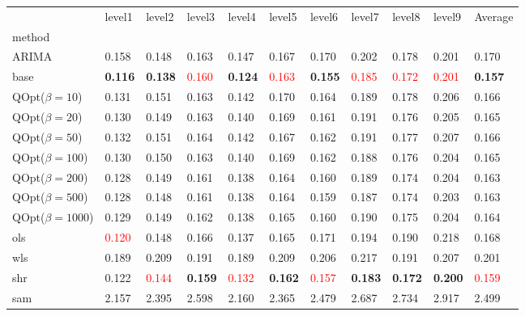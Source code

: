 \begin{tabular}{lllllllllll}
\toprule
 & level1 & level2 & level3 & level4 & level5 & level6 & level7 & level8 & level9 & Average \\
method &  &  &  &  &  &  &  &  &  &  \\
\midrule
ARIMA & 0.158 & 0.148 & 0.163 & 0.147 & 0.167 & 0.170 & 0.202 & 0.178 & 0.201 & 0.170 \\
base & \textbf{0.116} & \textbf{0.138} & \textcolor{red}{0.160} & \textbf{0.124} & \textcolor{red}{0.163} & \textbf{0.155} & \textcolor{red}{0.185} & \textcolor{red}{0.172} & \textcolor{red}{0.201} & \textbf{0.157} \\
\midrule
QOpt($\beta=10$) & 0.131 & 0.151 & 0.163 & 0.142 & 0.170 & 0.164 & 0.189 & 0.178 & 0.206 & 0.166 \\
QOpt($\beta=20$) & 0.130 & 0.149 & 0.163 & 0.140 & 0.169 & 0.161 & 0.191 & 0.176 & 0.205 & 0.165 \\
QOpt($\beta=50$) & 0.132 & 0.151 & 0.164 & 0.142 & 0.167 & 0.162 & 0.191 & 0.177 & 0.207 & 0.166 \\
QOpt($\beta=100$) & 0.130 & 0.150 & 0.163 & 0.140 & 0.169 & 0.162 & 0.188 & 0.176 & 0.204 & 0.165 \\
QOpt($\beta=200$) & 0.128 & 0.149 & 0.161 & 0.138 & 0.164 & 0.160 & 0.189 & 0.174 & 0.204 & 0.163 \\
QOpt($\beta=500$) & 0.128 & 0.148 & 0.161 & 0.138 & 0.164 & 0.159 & 0.187 & 0.174 & 0.203 & 0.163 \\
QOpt($\beta=1000$) & 0.129 & 0.149 & 0.162 & 0.138 & 0.165 & 0.160 & 0.190 & 0.175 & 0.204 & 0.164 \\
\midrule
ols & \textcolor{red}{0.120} & 0.148 & 0.166 & 0.137 & 0.165 & 0.171 & 0.194 & 0.190 & 0.218 & 0.168 \\
wls & 0.189 & 0.209 & 0.191 & 0.189 & 0.209 & 0.206 & 0.217 & 0.191 & 0.207 & 0.201 \\
shr & 0.122 & \textcolor{red}{0.144} & \textbf{0.159} & \textcolor{red}{0.132} & \textbf{0.162} & \textcolor{red}{0.157} & \textbf{0.183} & \textbf{0.172} & \textbf{0.200} & \textcolor{red}{0.159} \\
sam & 2.157 & 2.395 & 2.598 & 2.160 & 2.365 & 2.479 & 2.687 & 2.734 & 2.917 & 2.499 \\
\bottomrule
\end{tabular}